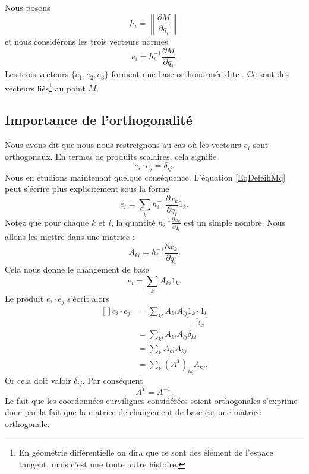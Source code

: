 Nous posons
\begin{equation}
    h_i=\left\| \frac{ \partial M }{ \partial q_i } \right\|
\end{equation}
et nous considérons les trois vecteurs normés
\begin{equation}        \label{EqDefeihMq}
    e_i=h_i^{-1}\frac{ \partial M }{ \partial q_i }.
\end{equation}
Les trois vecteurs $\{ e_1,e_2,e_3 \}$ forment une base orthonormée dite . Ce sont des vecteurs liés\footnote{En géométrie différentielle on dira que ce sont des élément de l'espace tangent, mais c'est une toute autre histoire.} au point $M$.

\subsection{Importance de l'orthogonalité}

Nous avons dit que nous nous restreignons au cas où les vecteurs $e_i$ sont orthogonaux. En termes de produits scalaires, cela signifie
\begin{equation}
    e_i\cdot e_j=\delta_{ij}.
\end{equation}
Nous en étudions maintenant quelque conséquence. L'équation \eqref{EqDefeihMq} peut s'écrire plus explicitement sous la forme
\begin{equation}
    e_i=\sum_k h_i^{-1}\frac{ \partial x_k }{ \partial q_i }1_k.
\end{equation}
Notez que pour chaque $k$ et $i$, la quantité $h_i^{-1}\frac{ \partial x_k }{ \partial q_i }$ est un simple nombre. Nous allons les mettre dans une matrice :
\begin{equation}
    A_{ki}=h_i^{-1}\frac{ \partial x_k }{ \partial q_i }.
\end{equation}
Cela nous donne le changement de base
\begin{equation}        \label{EqChmBaseeisAkiAk}
    e_i=\sum_kA_{ki}1_k.
\end{equation}
Le produit $e_i\cdot e_j$ s'écrit alors
\begin{equation}
    \begin{aligned}[]
        e_i\cdot e_j&=\sum_{kl}A_{ki}A_{lj}\underbrace{1_k\cdot 1_l}_{=\delta_{kl}}\\
        &=\sum_{kl}A_{ki}A_{lj}\delta_{kl}\\
        &=\sum_kA_{ki}A_{kj}\\
        &=\sum_k(A^T)_{ik}A_{kj}.
    \end{aligned}
\end{equation}
Or cela doit valoir $\delta_{ij}$. Par conséquent 
\begin{equation}
    A^T=A^{-1}.
\end{equation}
Le fait que les coordonnées curvilignes considérées soient orthogonales s'exprime donc par la fait que la matrice de changement de base est une matrice orthogonale.

